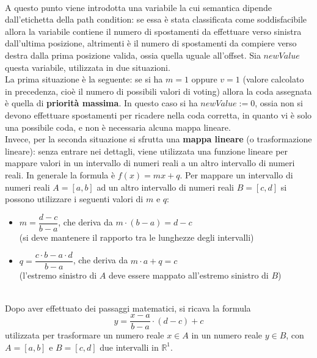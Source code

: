\documentclass[a4paper, 12pt, oneside]{book}
\theoremstyle{normal}
\begin{document}
\\ A questo punto viene introdotta una variabile la cui semantica dipende dall'etichetta della path condition: se essa è stata classificata come soddisfacibile allora la variabile contiene il numero di spostamenti da effettuare verso sinistra dall'ultima posizione, altrimenti è il numero di spostamenti da compiere verso destra dalla prima posizione valida, ossia quella uguale all'offset. Sia $newValue$ questa variabile, utilizzata in due situazioni. 
\\ La prima situazione è la seguente: se si ha $m = 1$ oppure $v = 1$ (valore calcolato in precedenza, cioè il numero di possibili valori di voting) allora la coda assegnata è quella di \textbf{priorità massima}. In questo caso si ha $newValue := 0$, ossia non si devono effettuare spostamenti per ricadere nella coda corretta, in quanto vi è solo una possibile coda, e non è necessaria alcuna mappa lineare.
\\ Invece, per la seconda situazione si sfrutta una \textbf{mappa lineare} (o trasformazione lineare): senza entrare nei dettagli, viene utilizzata una funzione lineare per mappare valori in un intervallo di numeri reali a un altro intervallo di numeri reali. In generale la formula è $f(x) = mx + q$. Per mappare un intervallo di numeri reali $A = [a, b]$ ad un altro intervallo di numeri reali $B = [c, d]$ si possono utilizzare i seguenti valori di $m$ e $q$:
\begin{itemize}[itemsep=0pt, topsep=2pt]
    \item $m = \dfrac{d - c}{b - a}$, che deriva da $m \cdot (b - a) = d - c$ \\ (si deve mantenere il rapporto tra le lunghezze degli intervalli)
    \item $q = \dfrac{c \cdot b - a \cdot d}{b - a}$, che deriva da $m \cdot a + q = c$ \\ (l'estremo sinistro di $A$ deve essere mappato all'estremo sinistro di $B$)
\end{itemize}
\noindent \\ Dopo aver effettuato dei passaggi matematici, si ricava la formula \[y = \dfrac{x - a}{b - a} \cdot (d - c) + c\] utilizzata per trasformare un numero reale $x \in A$ in un numero reale $y \in B$, con $A = [a, b]$ e $B = [c, d]$ due intervalli in $\mathbb{R}^1$.
\end{document}
